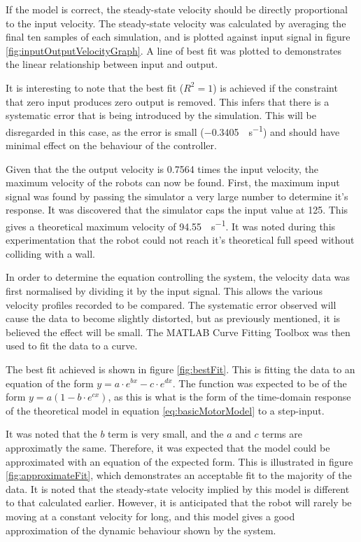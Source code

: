 \documentclass[10pt]{article}
\begin{document}
If the model is correct, the steady-state velocity should be directly
proportional to the input velocity.  The steady-state velocity was calculated by
averaging the final ten samples of each simulation, and is plotted against input
signal in figure \ref{fig:inputOutputVelocityGraph}.  A line of best fit was
plotted to demonstrates the linear relationship between input and output.

It is interesting to note that the best fit ($R^2 = 1$) is achieved if the
constraint that zero input produces zero output is removed.  This infers that
there is a systematic error that is being introduced by the simulation.  This
will be disregarded in this case, as the error is small
(\SI{-0.3405}{\inch\per\second}) and should have minimal effect on the behaviour
of the controller.

Given that the the output velocity is 0.7564 times the input velocity, the
maximum velocity of the robots can now be found. First, the maximum input signal
was found by passing the simulator a very large number to determine it's
response. It was discovered that the simulator caps the input value at 125.
This gives a theoretical maximum velocity of \SI{94.55}{\inch\per\second}.   It
was noted during this experimentation that the robot could not reach it's
theoretical full speed without colliding with a wall.

In order to determine the equation controlling the system, the velocity data was
first normalised by dividing it by the input signal.  This allows the various
velocity profiles recorded to be compared.  The systematic error observed will
cause the data to become slightly distorted, but as previously mentioned, it is
believed the effect will be small.  The MATLAB Curve Fitting Toolbox was then
used to fit the data to a curve.

The best fit achieved is shown in figure \ref{fig:bestFit}.  This is fitting the
data to an equation of the form $y = a \cdot e^{bx} - c \cdot e^{dx} $.  The
function was expected to be of the form $y = a(1-b \cdot e^{cx})$, as this is
what is the form of the time-domain response of the theoretical model in
equation \ref{eq:basicMotorModel} to a step-input.

It was noted that the $b$ term is very small, and the $a$ and $c$ terms are
approximatly the same.  Therefore, it was expected that the model could be
approximated with an equation of the expected form.  This is illustrated in
figure \ref{fig:approximateFit}, which demonstrates an acceptable fit to the
majority of the data.  It is noted that the steady-state velocity implied by
this model is different to that calculated earlier.  However, it is anticipated
that the robot will rarely be moving at a constant velocity for long, and this
model gives a good approximation of the dynamic behaviour shown by the system.
\end{document}
